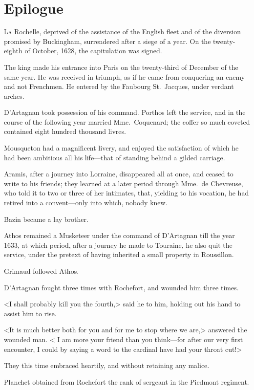 
\chapter{Epilogue}
\lettrine{L}{a} Rochelle, deprived of the assistance of the English fleet and of the diversion promised by Buckingham, surrendered after a siege of a year. On the twenty-eighth of October, 1628, the capitulation was signed. 

\zz
The king made his entrance into Paris on the twenty-third of December of the same year. He was received in triumph, as if he came from conquering an enemy and not Frenchmen. He entered by the Faubourg St.~Jacques, under verdant arches. 

D'Artagnan took possession of his command. Porthos left the service, and in the course of the following year married Mme.~Coquenard; the coffer so much coveted contained eight hundred thousand livres. 

Mousqueton had a magnificent livery, and enjoyed the satisfaction of which he had been ambitious all his life—that of standing behind a gilded carriage. 

Aramis, after a journey into Lorraine, disappeared all at once, and ceased to write to his friends; they learned at a later period through Mme.~de Chevreuse, who told it to two or three of her intimates, that, yielding to his vocation, he had retired into a convent—only into which, nobody knew. 

Bazin became a lay brother. 

Athos remained a Musketeer under the command of D'Artagnan till the year 1633, at which period, after a journey he made to Touraine, he also quit the service, under the pretext of having inherited a small property in Roussillon. 

Grimaud followed Athos. 

D'Artagnan fought three times with Rochefort, and wounded him three times. 

<I shall probably kill you the fourth,> said he to him, holding out his hand to assist him to rise. 

<It is much better both for you and for me to stop where we are,> answered the wounded man. < I am more your friend than you think—for after our very first encounter, I could by saying a word to the cardinal have had your throat cut!> 

They this time embraced heartily, and without retaining any malice. 

Planchet obtained from Rochefort the rank of sergeant in the Piedmont regiment. 

